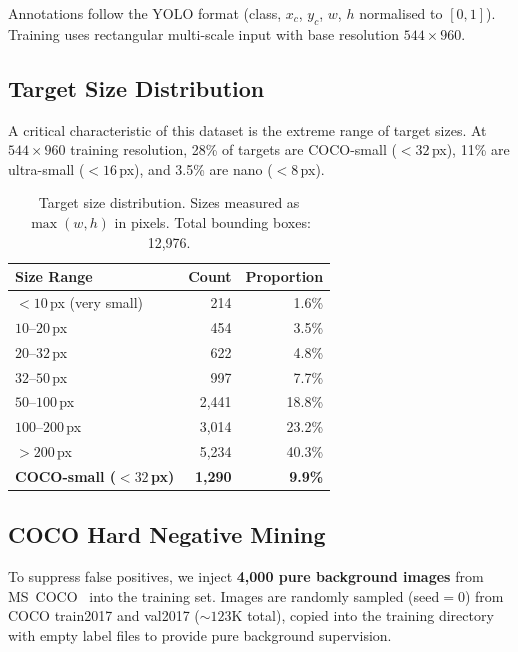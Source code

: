 \documentclass[12pt, titlepage]{article}
\begin{document}
Annotations follow the YOLO format (class, $x_c$, $y_c$, $w$, $h$ normalised to
$[0,1]$). Training uses rectangular multi-scale input with base resolution
$544{\times}960$.

\subsection{Target Size Distribution}
\label{sec:target_size}

A critical characteristic of this dataset is the extreme range of target sizes.
At $544{\times}960$ training resolution, 28\% of targets are COCO-small
($<32$\,px), 11\% are ultra-small ($<16$\,px), and 3.5\% are nano ($<8$\,px).

\begin{table}[h]
  \centering
  \caption{Target size distribution.  Sizes measured as $\max(w, h)$ in
    pixels.  Total bounding boxes: 12{,}976.}
  \label{tab:size_dist}
  \begin{tabular}{@{}lrr@{}}
    \toprule
    \textbf{Size Range}             & \textbf{Count}   & \textbf{Proportion} \\
    \midrule
    $<10$\,px (very small)          & 214              & 1.6\%               \\
    $10$--$20$\,px                  & 454              & 3.5\%               \\
    $20$--$32$\,px                  & 622              & 4.8\%               \\
    $32$--$50$\,px                  & 997              & 7.7\%               \\
    $50$--$100$\,px                 & 2{,}441          & 18.8\%              \\
    $100$--$200$\,px                & 3{,}014          & 23.2\%              \\
    $>200$\,px                      & 5{,}234          & 40.3\%              \\
    \midrule
    \textbf{COCO-small ($<32$\,px)} & \textbf{1{,}290} & \textbf{9.9\%}      \\
    \bottomrule
  \end{tabular}
\end{table}

\subsection{COCO Hard Negative Mining}
\label{sec:coco_neg}

To suppress false positives, we inject \textbf{4{,}000 pure background images}
from MS~COCO~\citep{lin2014coco} into the training set. Images are randomly
sampled (seed$=0$) from COCO train2017 and val2017 (${\sim}123$K total), copied
into the training directory with empty label files to provide pure background
supervision.
\end{document}

